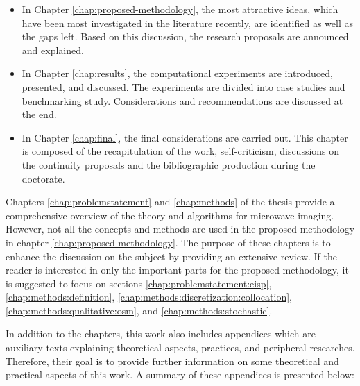 \begin{itemize}
			\item In Chapter \ref{chap:proposed-methodology}, the most attractive ideas, which have been most investigated in the literature recently, are identified as well as the gaps left. Based on this discussion, the research proposals are announced and explained.
			\item In Chapter \ref{chap:results}, the computational experiments are introduced, presented, and discussed. The experiments are divided into case studies and benchmarking study. Considerations and recommendations are discussed at the end.
			\item In Chapter \ref{chap:final}, the final considerations are carried out. This chapter is composed of the recapitulation of the work, self-criticism, discussions on the continuity proposals and the bibliographic production during the doctorate.
		\end{itemize}
		
		Chapters \ref{chap:problemstatement} and \ref{chap:methods} of the thesis provide a comprehensive overview of the theory and algorithms for microwave imaging. However, not all the concepts and methods are used in the proposed methodology in chapter \ref{chap:proposed-methodology}. The purpose of these chapters is to enhance the discussion on the subject by providing an extensive review. If the reader is interested in only the important parts for the proposed methodology, it is suggested to focus on sections \ref{chap:problemstatement:eisp}, \ref{chap:methods:definition}, \ref{chap:methods:discretization:collocation}, \ref{chap:methods:qualitative:osm}, and \ref{chap:methods:stochastic}.
		
		In addition to the chapters, this work also includes appendices which are auxiliary texts explaining theoretical aspects, practices, and peripheral researches. Therefore, their goal is to provide further information on some theoretical and practical aspects of this work. A summary of these appendices is presented below:
		
